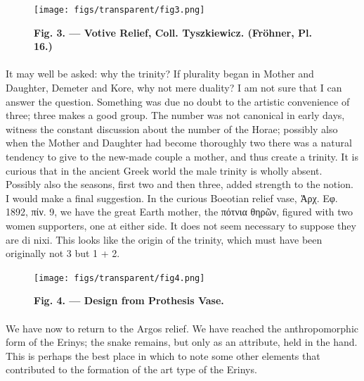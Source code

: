 \documentclass[a4paper, 11pt, oneside, polutonikogreek, english]{article}
\begin{document}
\begin{figure}[H]
\centering
\texttt{[image: figs/transparent/fig3.png]}
\caption{\bfseries Fig. 3. --- Votive Relief, Coll. Tyszkiewicz. (Fröhner, Pl. 16.)}
\end{figure}
\paragraph{}
It may well be asked: why the trinity? If plurality began in Mother and Daughter, Demeter and Kore, why not mere duality? I am not sure that I can answer the question. Something was due no doubt to the artistic convenience of three; three makes a good group. The number was not canonical in early days, witness the constant discussion about the number of the Horae; possibly also when the Mother and Daughter had become thoroughly two there was a natural tendency to give to the new-made couple a mother, and thus create a trinity. It is curious that in the ancient Greek world the male trinity is wholly absent. Possibly also the seasons, first two and then three, added strength to the notion. I would make a final suggestion. In the curious Boeotian relief vase, Ἀρχ. Εφ. 1892, πίν. 9, we have the great Earth mother, the πότνια θηρῶν, figured with two women supporters, one at either side. It does not seem necessary to suppose they are di nixi. This looks like the origin of the trinity, which must have been originally not 3 but 1 + 2.
\begin{figure}[H]
\centering
\texttt{[image: figs/transparent/fig4.png]}
\caption{\bfseries Fig. 4. --- Design from Prothesis Vase.}
\end{figure}
\paragraph{}
We have now to return to the Argos relief. We have reached the anthropomorphic form of the Erinys; the snake remains, but only as an attribute, held in the hand. This is perhaps the best place in which to note some other elements that contributed to the formation of the art type of the Erinys.
\end{document}
